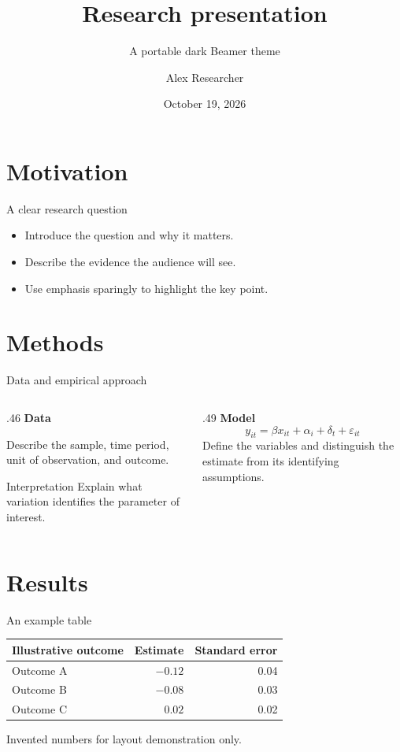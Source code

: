\documentclass[aspectratio=169]{beamer}
\title[Research presentation]{Research presentation}
\subtitle{A portable dark Beamer theme}
\author[A. Researcher]{Alex Researcher}
\institute{Department / University}
\date{October 19, 2026}
\begin{document}
\begin{frame}[plain]
  \titlepage
\end{frame}

\section{Motivation}
\begin{frame}{A clear research question}
  \begin{itemize}
    \setlength{\itemsep}{5mm}
    \item Introduce the question and why it matters.
    \item Describe the evidence the audience will see.
    \item Use \alert{emphasis} sparingly to highlight the key point.
  \end{itemize}
\end{frame}

\section{Methods}
\begin{frame}{Data and empirical approach}
  \begin{columns}[T,onlytextwidth]
    \begin{column}{.46\textwidth}
      \textbf{Data}\par\medskip
      Describe the sample, time period, unit of observation, and outcome.
      \medskip
      \begin{block}{Interpretation}
        Explain what variation identifies the parameter of interest.
      \end{block}
    \end{column}
    \begin{column}{.49\textwidth}
      \textbf{Model}
      \[
        y_{it}=\beta x_{it}+\alpha_i+\delta_t+\varepsilon_{it}
      \]
      \small Define the variables and distinguish the estimate from its identifying assumptions.
    \end{column}
  \end{columns}
\end{frame}

\section{Results}
\begin{frame}{An example table}
  \centering
  \begin{tabular}{lrr}
    \toprule
    Illustrative outcome & Estimate & Standard error\\
    \midrule
    Outcome A & $-0.12$ & 0.04\\
    Outcome B & $-0.08$ & 0.03\\
    Outcome C & $ 0.02$ & 0.02\\
    \bottomrule
  \end{tabular}
  \par\vspace{6mm}
  {\small\color{smokemuted}Invented numbers for layout demonstration only.}
\end{frame}
\end{document}

